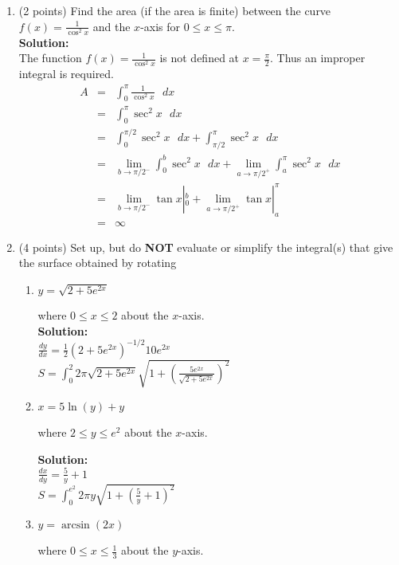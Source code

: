 \documentclass[paper=a4, fontsize=11pt]{scrartcl} %
\numberwithin{equation}{section} %
\numberwithin{figure}{section} %
\numberwithin{table}{section} %
\begin{document}
\begin{enumerate}
\item (2 points) Find the area (if the area is finite) between the curve $f(x)=\frac{1}{\cos^2 x}$ and the $x$-axis for $0 \le x \le \pi$.\\

\noindent\textbf{Solution:}\\
The function $f(x)=\frac{1}{\cos^2 x}$ is not defined at $x=\frac{\pi}{2}$. Thus an improper integral is required. \\

\begin{eqnarray*}
A&=& \int_0^\pi  \frac{1}{\cos^2 x} \text{ } dx \\
&=& \int_0^\pi  \sec^2 x \text{ } dx \\
&=& \int_0^{\pi/2}  \sec^2 x \text{ } dx + \int_{\pi/2}^\pi  \sec^2 x \text{ } dx \\
&=&\lim\limits_{b \rightarrow \pi/2^- } \int_0^{b}  \sec^2 x \text{ } dx + \lim\limits_{a \rightarrow \pi/2^+ } \int_{a}^\pi  \sec^2 x \text{ } dx\\
&=&\lim\limits_{b \rightarrow \pi/2^- } \tan x|_0^{b}  + \lim\limits_{a \rightarrow \pi/2^+ } \tan x|_{a}^\pi \\
&=& \infty
\end{eqnarray*}

\newpage


\item (4 points) Set up, but do \textbf{NOT} evaluate or simplify the integral(s) that give the surface obtained by rotating 
\begin{enumerate}
\item \begin{large}$y=\sqrt{2+5e^{2x}}$\end{large} where $0 \le x \le 2$ about the $x$-axis. \\

\noindent\textbf{Solution:}\\
$\frac{dy}{dx}=\frac{1}{2}(2+5e^{2x})^{-1/2}10e^{2x}$ \\
$S=\int_0^2 2 \pi \sqrt{2+5e^{2x}} \sqrt{1+\left(\frac{5e^{2x}}{\sqrt{2+5e^{2x}}}\right)^2}$

\vspace{.5in}
\item \begin{large}$x=5 \ln(y) + y$\end{large} where $2 \le y \le e^2$ about the $x$-axis.


\noindent\textbf{Solution:}\\
$\frac{dx}{dy}=\frac{5}{y}+1$ \\
$S=\int_0^{e^2} 2 \pi y \sqrt{1+\left(\frac{5}{y}+1\right)^2}$
\vspace{.5in}
\item \begin{large}$y=\arcsin(2x)$\end{large} where $0 \le x \le \frac{1}{3}$ about the $y$-axis.


\end{enumerate}
\end{enumerate}
\end{document}
